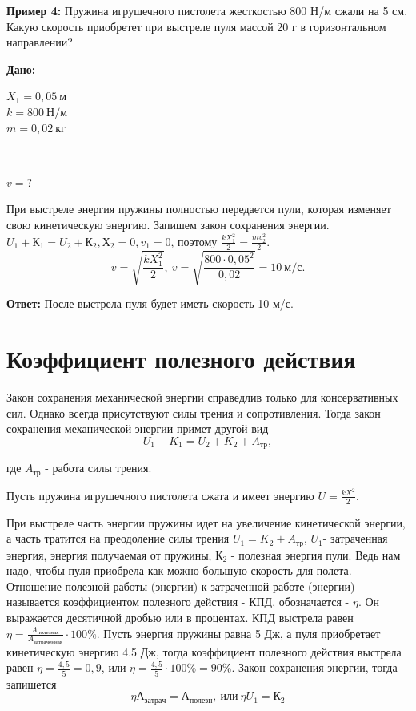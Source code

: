 \documentclass[a5paper, 10pt]{diss_4}
\renewcommand{\'}{\,'}
\begin{document}
\textbf{Пример 4:} Пружина игрушечного пистолета жесткостью 800 Н/м сжали на 5 см. Какую скорость приобретет при выстреле пуля массой 20 г в горизонтальном направлении?

\hspace{1cm}\textbf{Дано:}\hspace{.3cm}
\parbox[t]{4cm}{
$X_1= 0,05\ м$\\
$k= 800\ Н/м$\\
$m=0,02\ кг$\\
\rule{4cm}{.4pt}\\
$v = ?$\\
}

При выстреле энергия пружины полностью передается пули, которая изменяет свою кинетическую энергию. Запишем закон сохранения энергии.  $U_1+К_1=U_2+К_2,  Х_2=0,  v_1=0$,  поэтому $\frac{kX^2_1}{2}=\frac{mv_2^2}{2}$.
\[
v=\sqrt{\frac{kX^2_1}{2}},\
v=\sqrt{\frac{800\cdot0,05^2}{0,02}}=10\ м/с.
\]

\textbf{Ответ:} После выстрела пуля будет иметь скорость 10 м/с.

\section{Коэффициент полезного действия}

Закон сохранения механической энергии справедлив только для консервативных сил. Однако всегда присутствуют силы трения и сопротивления. Тогда закон сохранения механической энергии примет другой вид
\[
U_1+K_1=U_2+K_2+A_{тр},
\]

где $A_{тр}$ - работа силы трения.

Пусть пружина игрушечного пистолета сжата и имеет энергию $U=\frac{kX^2}{2}$.

При  выстреле часть энергии пружины идет на увеличение кинетической энергии, а часть тратится на преодоление силы трения $U_1=K_2+ A_{тр}$, $U_1$- затраченная энергия, энергия получаемая от пружины, $К_2$ - полезная энергия пули. Ведь нам надо, чтобы пуля приобрела как можно большую скорость для полета. Отношение полезной работы (энергии) к затраченной работе (энергии) называется коэффициентом полезного действия - КПД, обозначается - $\eta$. Он выражается десятичной дробью или в процентах. КПД выстрела равен $\eta=\frac{A_{полезная}}{A_{затраченная}}\cdot100\%$. Пусть энергия пружины равна 5 Дж, а пуля приобретает кинетическую энергию 4.5 Дж, тогда коэффициент полезного действия выстрела равен $\eta=\frac{4,5}{5}=0,9$, или $\eta=\frac{4,5}{5}\cdot100\%=90\%$. Закон сохранения энергии, тогда запишется
\[
\eta А_{затрач}= А_{полезн},\ или\ \eta U_1=К_2
\]
\end{document}

